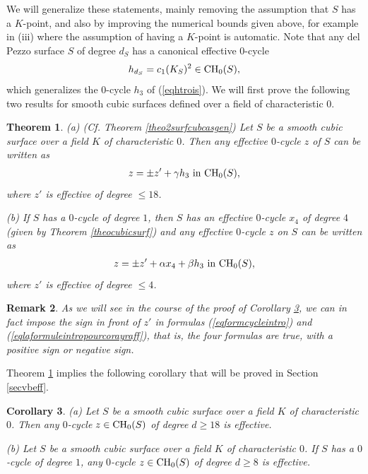 \documentclass[10pt]{article}
\newtheorem{theo}{Theorem}[section]
\newtheorem{coro}[theo]{Corollary}
\newtheorem{rema}[theo]{Remark}
\begin{document}
We will generalize  these  statements, mainly removing the assumption that $S$ has a $K$-point, and also by improving the numerical bounds given above, for example in (iii) where the assumption of having a $K$-point is automatic. Note that any del Pezzo surface $S$ of degree $d_S$  has a canonical effective $0$-cycle $$h_{d_S}=c_1(K_S)^2\in{\rm CH}_0(S),$$ which  generalizes the $0$-cycle $h_3$ of (\ref{eqhtrois}).  We will first prove the following two results for smooth cubic surfaces defined over a field of characteristic $0$.
\begin{theo} \label{theo2surfcub} (a) (Cf. Theorem \ref{theo2surfcubcasgen}) Let $S$ be a  smooth cubic surface over  a field $K$ of characteristic $0$. Then any  effective $0$-cycle $z$ of $S$ can be written as
 \begin{eqnarray}\label{eqformcycleintro} z= \pm z'+\gamma h_3\,\,{\rm in}\,\,{\rm CH}_0(S),\end{eqnarray}
 where  $z'$ is effective of degree $\leq 18$.

(b)  If $S$ has a $0$-cycle of degree $1$,  then $S$ has an effective $0$-cycle $x_4$ of degree $4$ (given by Theorem \ref{theocubicsurf}) and any effective $0$-cycle $z$   on $S$ can be written as
\begin{eqnarray}\label{eqlaformuleintropourcorayraff} z=\pm z'+\alpha x_4+\beta h_3\,\,{\rm in}\,\,{\rm CH}_0(S),
\end{eqnarray}
where $z'$ is effective of degree $\leq 4$.
\end{theo}
\begin{rema} \label{remapoursigne}{\rm  As we will see in the course of the proof of Corollary \ref{coroeff}, we can in fact impose the sign in front of $z'$ in formulas (\ref{eqformcycleintro}) and  (\ref{eqlaformuleintropourcorayraff}), that is, the four formulas  are true,  with a positive sign or negative sign.} \end{rema}

Theorem \ref{theo2surfcub} implies the following corollary that will be proved in Section \ref{secvbeff}.
\begin{coro} \label{coroeff} (a) Let $S$ be a smooth cubic surface over a field $K$ of characteristic $0$. Then any $0$-cycle $z\in {\rm CH}_0(S)$ of degree $d\geq 18$ is effective.

(b) Let $S$ be a smooth cubic surface over a field $K$ of characteristic $0$. If $S$ has a $0$-cycle of degree $1$, any
$0$-cycle $z\in {\rm CH}_0(S)$ of degree $d\geq 8$ is effective.
\end{coro}
\end{document}
